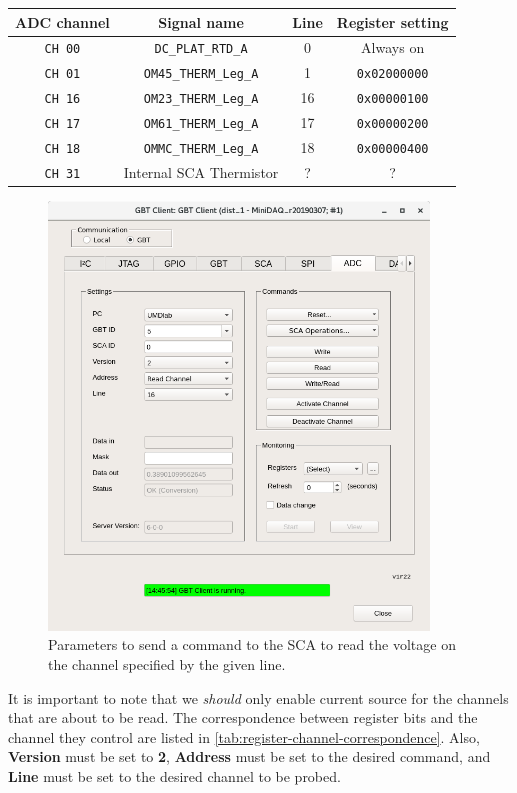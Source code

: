 \begin{center}
    \begin{tabular}{cccc}
        \toprule
        ADC channel & Signal name & Line & Register setting \\
        \midrule
        \texttt{CH 00} & \texttt{DC\_PLAT\_RTD\_A}    & 0  & Always on \\
        \texttt{CH 01} & \texttt{OM45\_THERM\_Leg\_A} & 1  & \texttt{0x02000000} \\
        \texttt{CH 16} & \texttt{OM23\_THERM\_Leg\_A} & 16 & \texttt{0x00000100} \\
        \texttt{CH 17} & \texttt{OM61\_THERM\_Leg\_A} & 17 & \texttt{0x00000200} \\
        \texttt{CH 18} & \texttt{OMMC\_THERM\_Leg\_A} & 18 & \texttt{0x00000400} \\
        \texttt{CH 31} & Internal SCA Thermistor      & ?  & ? \\
        \bottomrule
    \end{tabular}
    \label{tab:register-channel-correspondence}
\end{center}

\begin{figure}[ht]
    \centering
    \includegraphics[width=0.9\textwidth]{res/gbt_client_adc_readout_readchannel.png}
    \caption{
        Parameters to send a command to the SCA to read the voltage on the
        channel specified by the given line.
    }
    \label{fig:adc-readout}
\end{figure}

It is important to note that we \emph{should} only enable current source for the
channels that are about to be read.
The correspondence between register bits and the channel they control are listed
in \autoref{tab:register-channel-correspondence}.
Also, \textbf{Version} must be set to \textbf{2}, \textbf{Address} must be set
to the desired command, and \textbf{Line} must be set to the desired channel to
be probed.
